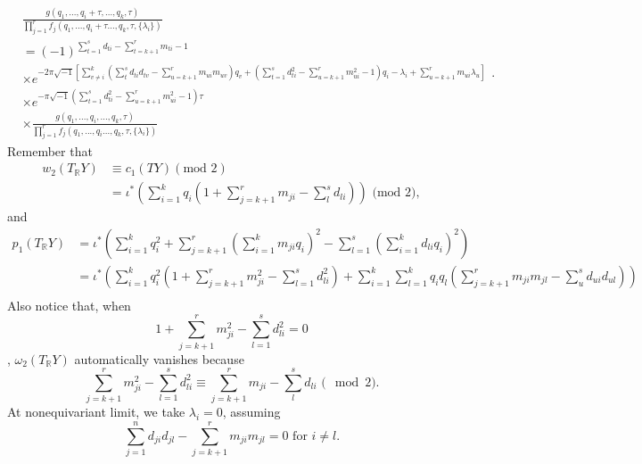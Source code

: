 \documentclass[11pt]{article}
\newcommand{\reals}{\mathbb R}
\begin{document}
\begin{equation*}
\begin{aligned}
&\frac{g(q_1,...,q_i+\tau,...,q_k,\tau)}{\prod_{j=1}^r f_j (q_1,...,q_i+\tau...,q_k,\tau,\{\lambda_i\})}\\
&=(-1)^{\sum_{t=1}^s d_{ti}-\sum_{t=k+1}^r m_{ti}-1}\\
&\times e^{-2\pi \sqrt{-1}[\sum_{v\neq i}^k(\sum_{t}^s d_{t i} d_{tv}-\sum_{u=k+1}^r m_{u i} m_{uv})q_v+(\sum_{t=1}^s d_{ti}^2-\sum^r_{u=k+1}m_{ui}^2-1)q_i-\lambda_i+\sum_{u=k+1}^r m_{ui}\lambda_u]}\\
&\times e^{-\pi \sqrt{-1}(\sum_{t=1}^s d_{ti}^2-\sum^r_{u=k+1}m_{ui}^2-1)\tau}\\
&\times \frac{g(q_1,...,q_i,...,q_k,\tau)}{\prod_{j=1}^r f_j (q_1,...,q_i...,q_k,\tau,\{\lambda_i\})}
\end{aligned}.
\end{equation*}
Remember that
\begin{equation*}
\begin{aligned}
w_2(T_\mathbb{R}Y)& \equiv c_1(TY) (\text{mod } 2)\\
& =\iota^*\left(\sum_{i=1}^k q_i(1+\sum_{j=k+1}^{r} m_{ji}-\sum_{l}^s d_{l i})\right) \text{     (mod } 2),
\end{aligned}
\end{equation*}
and
\begin{equation*}
\begin{aligned}
p_1(T_{\mathbb{R}}Y)&=\iota^*\left(\sum_{i=1}^k q_i^2+\sum_{j=k+1}^r (\sum_{i=1}^k m_{ji}q_i)^2-\sum_{l=1}^s(\sum_{i=1}^k d_{l i}q_i)^2\right)\\
&=\iota^*\left(\sum_{i=1}^k q_i^2(1+\sum_{j=k+1}^r m_{ji}^2-\sum_{l=1}^s d_{l i}^2)+\sum_{i=1}^k\sum_{l=1}^k q_i q_l(\sum^r_{j=k+1}m_{ji}m_{jl}-\sum_{u}^s d_{u i}d_{ul})\right)\\
\end{aligned}
\end{equation*}
Also notice that, when
\begin{equation*}
1+\sum_{j=k+1}^r m_{ji}^2-\sum_{l=1}^s d_{l i}^2=0
\end{equation*},
$\omega_2(T_\reals Y)$ automatically vanishes because
\begin{equation*}
\sum_{j=k+1}^r m_{ji}^2-\sum_{l=1}^s d_{l i}^2\equiv \sum_{j=k+1}^{r} m_{ji}-\sum_{l}^s d_{l i}\text{  ($\mod 2$)}.
\end{equation*}
At nonequivariant limit, we take $\lambda_i=0$, assuming
$$
\sum_{j=1}^n d_{ji} d_{j l}-\sum_{j=k+1}^r m_{ji}m_{j l}=0 \text{  for } i\neq l.
$$
\end{document}
